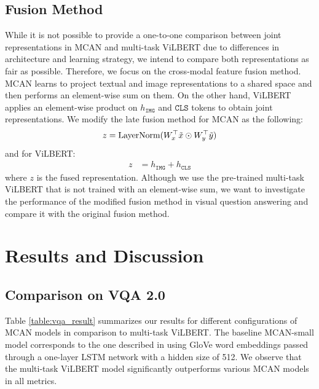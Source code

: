 \documentclass{article}
\begin{document}


\subsection{Fusion Method}
While it is not possible to provide a one-to-one comparison between joint representations in MCAN and multi-task ViLBERT due to differences in architecture and learning strategy, we intend to compare both representations as fair as possible. Therefore, we focus on the cross-modal feature fusion method. MCAN learns to project textual and image representations to a shared space and then performs an element-wise sum on them. On the other hand, ViLBERT applies an element-wise product on $h_{\mathtt{IMG}}$ and $\mathtt{CLS}$ tokens to obtain joint representations. We modify the late fusion method for MCAN as the following:
\begin{align}
    z &= \text{LayerNorm}(W^{\top}_{x}\Tilde{x} \odot W^{\top}_{y}\Tilde{y}) \\
\end{align}
and for ViLBERT:
\begin{align}
    z &= h_{\mathtt{IMG}} + h_{\mathtt{CLS}}
\end{align}
where $z$ is the fused representation. Although we use the pre-trained multi-task ViLBERT that is not trained with an element-wise sum, we want to investigate the performance of the modified fusion method in visual question answering and compare it with the original fusion method. 

\section{Results and Discussion}
\subsection{Comparison on VQA 2.0} \label{comp_vqa}
Table \ref{table:vqa_result} summarizes our results for different configurations of MCAN models in comparison to multi-task ViLBERT. The baseline MCAN-small model corresponds to the one described in \citet{yu2019mcan} using GloVe word embeddings passed through a one-layer LSTM network with a hidden size of 512. We observe that the multi-task ViLBERT model significantly outperforms various MCAN models in all metrics.
\end{document}
